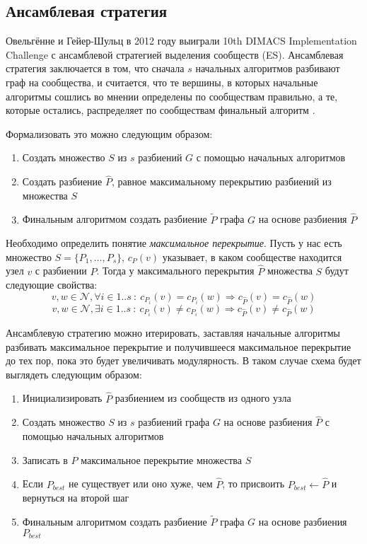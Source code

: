 
\subsection{Ансамблевая стратегия}

Овельгённе и Гейер-Шульц в 2012 году выиграли 10th DIMACS Implementation Challenge с ансамблевой стратегией выделения сообществ (ES). Ансамблевая стратегия заключается в том, что сначала $s$ начальных алгоритмов разбивают граф на сообщества, и считается, что те вершины, в которых начальные алгоритмы сошлись во мнении определены по сообществам правильно, а те, которые остались, распределяет по сообществам финальный алгоритм \cite{Ovelgoenne&Geyer-Schulz:2012b}.

Формализовать это можно следующим образом:
\begin{enumerate}
	\item Создать множество $S$ из $s$ разбиений $G$ с помощью начальных алгоритмов
	\item Создать разбиение $\hat{P}$, равное максимальному перекрытию разбиений из множества $S$
	\item Финальным алгоритмом создать разбиение $\widetilde{P}$ графа $G$ на основе разбиения $\hat{P}$
\end{enumerate}

Необходимо определить понятие \emph{максимальное перекрытие}. Пусть у нас есть множество $S = \{P_1, \dots, P_s\}$, $c_P(v)$ указывает, в каком сообществе находится узел $v$ с разбиении $P$.
Тогда у максимального перекрытия $\hat{P}$ множества $S$ будут следующие свойства:
$$v, w \in \mathscr{N}, \forall i \in 1..s\ :\ c_{P_i}(v) = c_{P_i}(w) \Rightarrow c_{\hat{P}}(v) = c_{\hat{P}}(w)$$
$$v, w \in \mathscr{N}, \exists i \in 1..s\ :\ c_{P_i}(v) \ne c_{P_i}(w) \Rightarrow c_{\hat{P}}(v) \ne c_{\hat{P}}(w)$$

Ансамблевую стратегию можно итерировать, заставляя начальные алгоритмы разбивать максимальное перекрытие и получившееся максимальное перекрытие до тех пор, пока это будет увеличивать модулярность. В таком случае схема будет выглядеть следующим образом:

\begin{enumerate}
	\item Инициализировать $\hat{P}$ разбиением из сообществ из одного узла
	\item Создать множество $S$ из $s$ разбиений графа $G$ на основе разбиения $\hat{P}$ с помощью начальных алгоритмов
	\item Записать в $\hat{P}$ максимальное перекрытие множества $S$
	\item Если $P_{best}$ не существует или оно хуже, чем $\hat{P}$, то присвоить $P_{best} \leftarrow \hat{P}$ и вернуться на второй шаг
	\item Финальным алгоритмом создать разбиение $\widetilde{P}$ графа $G$ на основе разбиения $P_{best}$ 
\end{enumerate}

